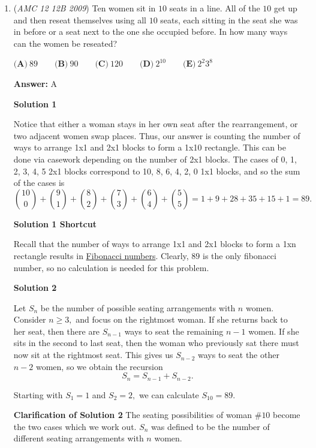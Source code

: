 \begin{enumerate}
 


	\item (\textit{AMC 12 12B 2009}) Ten women sit in $10$ seats in a line. All of the $10$ get up and then reseat themselves using all $10$ seats, each sitting in the seat she was in before or a seat next to the one she occupied before. In how many ways can the women be reseated?


 $\textbf{(A)}\ 89\qquad \textbf{(B)}\ 90\qquad \textbf{(C)}\ 120\qquad \textbf{(D)}\ 2^{10}\qquad \textbf{(E)}\ 2^2 3^8$

 \textbf{Answer: }A



\textbf{Solution 1}

Notice that either a woman stays in her own seat after the rearrangement, or two adjacent women swap places. Thus, our answer is counting the number of ways to arrange 1x1 and 2x1 blocks to form a 1x10 rectangle. This can be done via casework depending on the number of 2x1 blocks. The cases of 0, 1, 2, 3, 4, 5 2x1 blocks correspond to 10, 8, 6, 4, 2, 0 1x1 blocks, and so the sum of the cases is
 \[\binom{10}{0} + \binom{9}{1} + \binom{8}{2} + \binom{7}{3} + \binom{6}{4} + \binom{5}{5} = 1 + 9 + 28 + 35 + 15 + 1 = \boxed{89}.\]




\textbf{Solution 1 Shortcut}

Recall that the number of ways to arrange 1x1 and 2x1 blocks to form a 1xn rectangle results in \href{https://artofproblemsolving.com/wiki/index.php?title=Fibonacci\_numbers}{Fibonacci numbers}. Clearly, $\boxed{89}$ is the only fibonacci number, so no calculation is needed for this problem.

 



\textbf{Solution 2}

Let $S_n$ be the number of possible seating arrangements with $n$ women. Consider $n \ge 3,$ and focus on the rightmost woman. If she returns back to her seat, then there are $S_{n-1}$ ways to seat the remaining $n-1$ women. If she sits in the second to last seat, then the woman who previously sat there must now sit at the rightmost seat. This gives us $S_{n-2}$ ways to seat the other $n-2$ women, so we obtain the recursion
 \[S_n = S_{n-1}+S_{n-2}.\]

 Starting with $S_1=1$ and $S_2=2,$ we can calculate $S_{10}=\boxed{89}.$

 \textbf{Clarification of Solution 2} The seating possibilities of woman \#$10$ become the two cases which we work out. $S_n$ was defined to be the number of different seating arrangements with $n$ women.


\end{enumerate}

